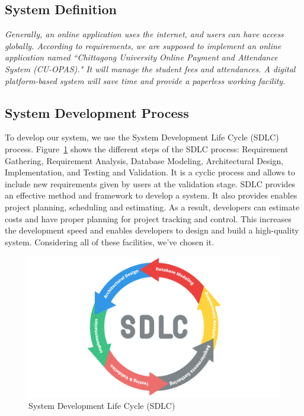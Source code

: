 \clearpage

\subsection{System Definition}\label{subsec:sd} 

\textit{Generally, an online application uses the internet, and users can have access globally. According to requirements, we are supposed to implement an online application named ``Chittagong University Online Payment and Attendance System (CU-OPAS)." It will manage the student fees and attendances. A digital platform-based system will save time and provide a paperless working facility.}


\subsection{System Development Process}\label{subsec:sdp}

To develop our system, we use the System Development Life Cycle (SDLC) process.\cite{sdlc} Figure~\ref{fig:sdlc} shows the different steps of the SDLC process: Requirement Gathering, Requirement Analysis, Database Modeling, Architectural Design, Implementation, and Testing and Validation. It is a cyclic process and allows to include new requirements given by users at the validation stage. SDLC provides an effective method and framework to develop a system. It also provides enables project planning, scheduling and estimating. As a result, developers can estimate costs and have proper planning for project tracking and control. This increases the development speed and enables developers to design and build a high-quality system. Considering all of these facilities, we've chosen it.

\begin{figure}[H]
    \centering
    \includegraphics[width=1\textwidth]{images/sdlc}
    \caption{System Development Life Cycle (SDLC)}
    \label{fig:sdlc}
\end{figure}

